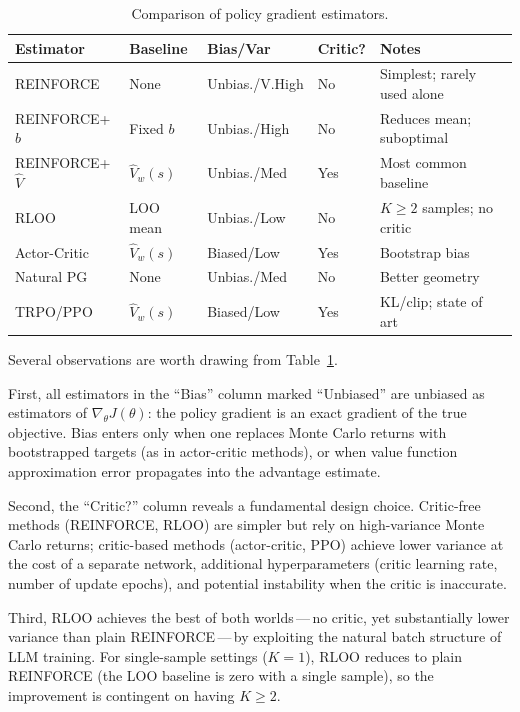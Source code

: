 \begin{table}[ht]
\centering
\caption{Comparison of policy gradient estimators.}
\label{tab:pg-comparison-ch8}
\small
\begin{tabular}{@{}llllp{3.2cm}@{}}
\toprule
\textbf{Estimator} & \textbf{Baseline} & \textbf{Bias/Var} & \textbf{Critic?} & \textbf{Notes} \\
\midrule
REINFORCE & None & Unbias./V.High & No & Simplest; rarely used alone \\
\addlinespace
REINFORCE+$b$ & Fixed $b$ & Unbias./High & No & Reduces mean; suboptimal \\
\addlinespace
REINFORCE+$\hat V$ & $\hat V_w(s)$ & Unbias./Med & Yes & Most common baseline \\
\addlinespace
RLOO & LOO mean & Unbias./Low & No & $K\!\geq\!2$ samples; no critic \\
\addlinespace
Actor-Critic & $\hat V_w(s)$ & Biased/Low & Yes & Bootstrap bias \\
\addlinespace
Natural PG & None & Unbias./Med & No & Better geometry \\
\addlinespace
TRPO/PPO & $\hat V_w(s)$ & Biased/Low & Yes & KL/clip; state of art \\
\bottomrule
\end{tabular}
\end{table}

Several observations are worth drawing from Table~\ref{tab:pg-comparison-ch8}.

First, all estimators in the ``Bias'' column marked ``Unbiased'' are unbiased as estimators of $\nabla_\theta J(\theta)$: the policy gradient is an exact gradient of the true objective.  Bias enters only when one replaces Monte Carlo returns with bootstrapped targets (as in actor-critic methods), or when value function approximation error propagates into the advantage estimate.

Second, the ``Critic?'' column reveals a fundamental design choice.  Critic-free methods (REINFORCE, RLOO) are simpler but rely on high-variance Monte Carlo returns; critic-based methods (actor-critic, PPO) achieve lower variance at the cost of a separate network, additional hyperparameters (critic learning rate, number of update epochs), and potential instability when the critic is inaccurate.

Third, RLOO achieves the best of both worlds\,---\,no critic, yet substantially lower variance than plain REINFORCE\,---\,by exploiting the natural batch structure of LLM training.  For single-sample settings ($K=1$), RLOO reduces to plain REINFORCE (the LOO baseline is zero with a single sample), so the improvement is contingent on having $K \geq 2$.

